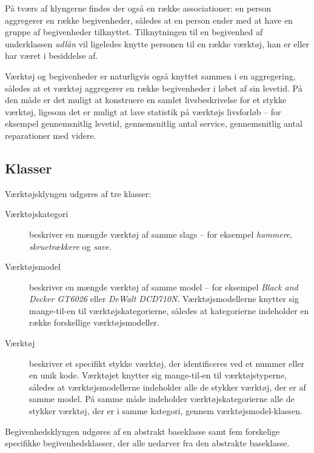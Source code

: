 \documentclass{article}
\begin{document}
På tværs af klyngerne findes der også en række associationer: en person aggregerer en række begivenheder, således at en person ender med at have en gruppe af begivenheder tilknyttet. Tilknytningen til en begivenhed af underklassen \emph{udlån} vil ligeledes knytte personen til en række værktøj, han er eller har været i besiddelse af.

Værktøj og begivenheder er naturligvis også knyttet sammen i en aggregering, således at et værktøj aggregerer en række begivenheder i løbet af sin levetid. På den måde er det muligt at konstruere en samlet livsbeskrivelse for et stykke værktøj, ligesom det er muligt at lave statistik på værktøjs livsforløb -- for eksempel gennemsnitlig levetid, gennemsnitlig antal service, gennemsnitlig antal reparationer med videre.

\subsection{Klasser}

Værktøjsklyngen udgøres af tre klasser:

\begin{description}

\item[Værktøjskategori] beskriver en mængde værktøj af samme slags -- for eksempel \emph{hammere}, \emph{skruetrækkere} og \emph{save}.

\item[Værktøjsmodel] beskriver en mængde værktøj af samme model -- for eksempel \emph{Black and Decker GT6026} eller \emph{DeWalt DCD710N}. Værktøjsmodellerne knytter sig mange-til-en til værktøjskategorierne, således at kategorierne indeholder en række forskellige værktøjsmodeller.

\item[Værktøj] beskriver et specifikt stykke værktøj, der identificeres ved et nummer eller en unik kode. Værktøjet knytter sig mange-til-en til værktøjstyperne, således at værktøjsmodellerne indeholder alle de stykker værktøj, der er af samme model. På samme måde indeholder værktøjskategorierne alle de stykker værktøj, der er i samme kategori, gennem værktøjsmodel-klassen.

\end{description}

Begivenhedsklyngen udgøres af en abstrakt baseklasse samt fem forskelige specifikke begivenhedsklasser, der alle nedarver fra den abstrakte baseklasse.
\end{document}
